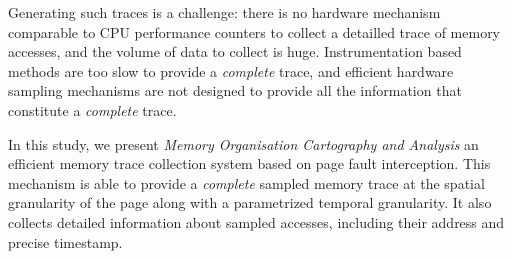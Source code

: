 Generating such traces is a challenge: there is no hardware mechanism
comparable to CPU performance counters to collect a detailled trace of memory accesses, and the volume
of data to collect is huge. Instrumentation based methods are too slow
to provide a \emph{complete} trace, and efficient hardware sampling mechanisms are not designed
to provide all the information that constitute a \emph{complete} trace.

In this study, we present \emph{Memory Organisation Cartography and Analysis}
an efficient memory trace collection system based on page fault interception.
This mechanism is able to provide a \emph{complete} sampled memory trace at
the spatial granularity of the page along with a parametrized temporal granularity.
It also collects detailed information about sampled accesses, including their address and
precise timestamp.

